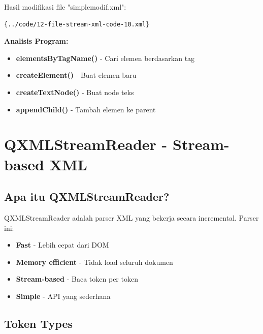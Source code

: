 Hasil modifikasi file "simplemodif.xml":

\begin{lstlisting}[language=xml]{../code/12-file-stream-xml-code-10.xml}
\end{lstlisting}

\textbf{Analisis Program:}
\begin{itemize}
\item \textbf{elementsByTagName()} - Cari elemen berdasarkan tag
\item \textbf{createElement()} - Buat elemen baru
\item \textbf{createTextNode()} - Buat node teks
\item \textbf{appendChild()} - Tambah elemen ke parent
\end{itemize}

\section{QXMLStreamReader - Stream-based XML}

\subsection{Apa itu QXMLStreamReader?}

QXMLStreamReader adalah parser XML yang bekerja secara incremental. Parser ini:

\begin{itemize}
\item \textbf{Fast} - Lebih cepat dari DOM
\item \textbf{Memory efficient} - Tidak load seluruh dokumen
\item \textbf{Stream-based} - Baca token per token
\item \textbf{Simple} - API yang sederhana
\end{itemize}

\subsection{Token Types}

